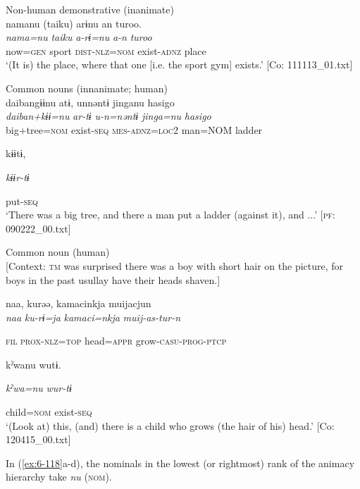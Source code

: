 \begin{table}
\ex Non-human demonstrative (inanimate)\\
{\TM}
\glll  namanu  ({\textbar}taiku{\textbar})  arɨnu  an  turoo.\\
\textit{nama=nu}  \textit{taiku}  \textit{a-rɨ=nu}  \textit{a-n}  \textit{turoo}\\
now=\textsc{gen}  sport  \textsc{dist}-\textsc{nlz}=\textsc{nom}  exist-\textsc{adnz}  place\\
\glt ‘(It is) the place, where that one [i.e. the sport gym] exists.’ [Co: 111113\_01.txt]
\z

\ex Common nouns (innanimate; human)\\
{\TM}
\glll  daibangɨɨnu  atɨ,  unnəntɨ  jinganu  {\textbar}hasigo{\textbar}\\
\textit{daiban+kɨɨ=nu}  \textit{ar-tɨ}  \textit{u-n=nəntɨ}  \textit{jinga=nu}  \textit{hasigo}\\
big+tree=\textsc{nom}  exist-\textsc{seq}  \textsc{mes}-\textsc{adnz}=\textsc{loc}2  man=NOM  ladder

      kɨɨtɨ,

      \textit{kɨɨr-tɨ}

      put-\textsc{seq}\\
\glt ‘There was a big tree, and there a man put a ladder (against it), and ...’ [\textsc{pf}: 090222\_00.txt]
\z

\ex Common noun (human)\\{}
[Context: \textsc{tm} was surprised there was a boy with short hair on the picture, for boys in the past usullay have their heads shaven.]

{\TM}
\glll naa,  kurəə,  kamacinkja  muijacjun\\

      \textit{naa}  \textit{ku-rɨ=ja}  \textit{kamaci=nkja}  \textit{muij-as-tur-n}

      \textsc{fil}  \textsc{prox}-\textsc{nlz}=\textsc{top}  head=\textsc{appr}  grow-\textsc{casu}-\textsc{prog}-\textsc{ptcp}

      kˀwanu  wutɨ.

      \textit{kˀwa=nu}  \textit{wur-tɨ}

      child=\textsc{nom}  exist-\textsc{seq}\\
\glt ‘(Look at) this, (and) there is a child who grows (the hair of his) head.’ [Co: 120415\_00.txt]
\z

In (\ref{ex:6-118}a-d), the nominals in the lowest (or rightmost) rank of the animacy hierarchy take \textit{nu} (\textsc{nom}).


\end{table}

